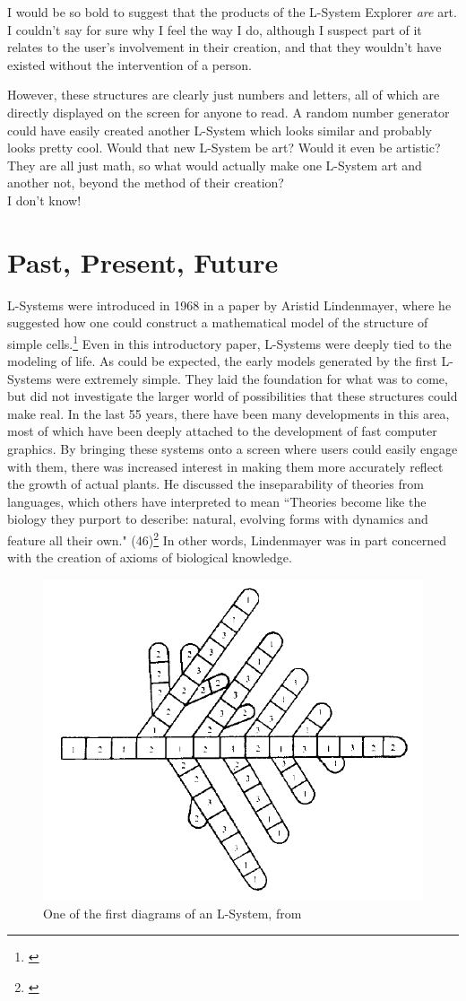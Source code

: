 \documentclass[12pt,twoside]{reedthesis}
\begin{document}
	I would be so bold to suggest that the products of the L-System Explorer \textit{are} art. I couldn't say for sure why I feel the way I do, although I suspect part of it relates to the user's involvement in their creation, and that they wouldn't have existed without the intervention of a person.
	
	However, these structures are clearly just numbers and letters, all of which are directly displayed on the screen for anyone to read. A random number generator could have easily created another L-System which looks similar and probably looks pretty cool. Would that new L-System be art? Would it even be artistic? They are all just math, so what would actually make one L-System art and another not, beyond the method of their creation?\\
	
	I don't know!


\chapter{Past, Present, Future}

	L-Systems were introduced in 1968 in a paper by Aristid Lindenmayer, where he suggested how one could construct a mathematical model of the structure of simple cells.\footnote{\cite{OG1967}} Even in this introductory paper, L-Systems were deeply tied to the modeling of life. As could be expected, the early models generated by the first L-Systems were extremely simple. They laid the foundation for what was to come, but did not investigate the larger world of possibilities that these structures could make real. In the last 55 years, there have been many developments in this area, most of which have been deeply attached to the development of fast computer graphics. By bringing these systems onto a screen where users could easily engage with them, there was increased interest in making them more accurately reflect the growth of actual plants. He discussed the inseparability of theories from languages, which others have interpreted to mean ``Theories become like the biology they purport to describe: natural, evolving forms with dynamics and feature all their own." (46)\footnote{\cite{theory2004}} In other words, Lindenmayer was in part concerned with the creation of axioms of biological knowledge.
	
	
	\begin{figure}[h]
	\centering
	\includegraphics[height = 0.4\linewidth]{Images/OGLSystem}
	\caption{One of the first diagrams of an L-System, from \cite{OG1967}}
	\label{OGLSystem}
	\end{figure}
	
\end{document}
